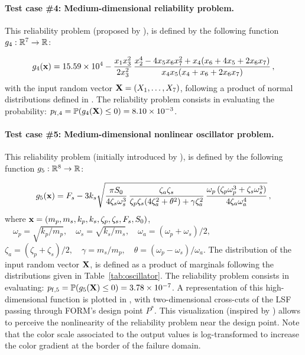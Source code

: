 \paragraph{Test case \#4: Medium-dimensional reliability problem.}
This reliability problem (proposed by \citealp{yun2018efficient}), is defined by the following function $g_4 : \mathbb{R}^7 \rightarrow \mathbb{R}$:

\begin{equation}
    g_4({\bf x}) = 15.59 \times 10^4 - \frac{x_1 x_3^2}{2 x_3^2} \, \frac{x_2^4 - 4 x_5 x_6 x_7^2 + x_4 (x_6 + 4 x_5 + 2 x_6 x_7)}{x_4 x_5 (x_4 + x_6 + 2 x_6 x_7)}\, ,
\end{equation}
with the input random vector ${\bf X} = (X_1, \dots, X_7)$, following a product of normal distributions defined in \cite{yun2018efficient}. 
The reliability problem consists in evaluating the probability: $p_{\mathrm{f}, 4} = \mathbb{P} ( g_4({\bf X}) \leq 0 ) =  8.10 \times 10^{-3}$.


\paragraph{Test case \#5: Medium-dimensional nonlinear oscillator problem.}
This reliability problem (initially introduced by \citealp{destefano_1990}), is defined by the following function $g_5 : \mathbb{R}^8 \rightarrow \mathbb{R}$:

\begin{equation}
    g_5({\bf x}) = F_s - 3 k_s \sqrt{\frac{\pi S_0}{4 \zeta_s \omega_s^3} \, \frac{\zeta_a \zeta_s}{\zeta_p \zeta_s (4 \zeta_a^2 + \theta^2) + \gamma \zeta_a^2} \, \frac{\omega_p \, (\zeta_p \omega_p^3 + \zeta_s \omega_s^3)}{4 \zeta_a \omega_a^4}} \, ,
\end{equation}
where ${\bf x} = \left(m_p, m_s, k_p, k_s, \zeta_p, \zeta_s, F_s, S_0\right)$,  
$\quad \omega_p=\sqrt{k_p/m_p}, \quad \omega_s=\sqrt{k_s/m_s}, \quad \omega_a = (\omega_p + \omega_s)/2, \quad $
$\zeta_a = (\zeta_p + \zeta_s)/2, \quad \gamma = m_s/m_p, \quad \theta= (\omega_p-\omega_s)/\omega_a$. 
The distribution of the input random vector ${\bf X}$, is defined as a product of marginals following the distributions given in Table~\ref{tab:oscillator}. 
The reliability problem consists in evaluating: $p_{\mathrm{f}, 5} = \mathbb{P} ( g_5({\bf X}) \leq 0 ) =  3.78 \times 10^{-7}$.
A representation of this high-dimensional function is plotted in , with two-dimensional cross-cuts of the LSF passing through FORM's design point $P^*$. 
This visualization (inspired by \citealp{dubourg_2011,bourinet_2018,chabridon_2018_thesis}) allows to perceive the nonlinearity of the reliability problem near the design point. 
Note that the color scale associated to the output values is log-transformed to increase the color gradient at the border of the failure domain. 

